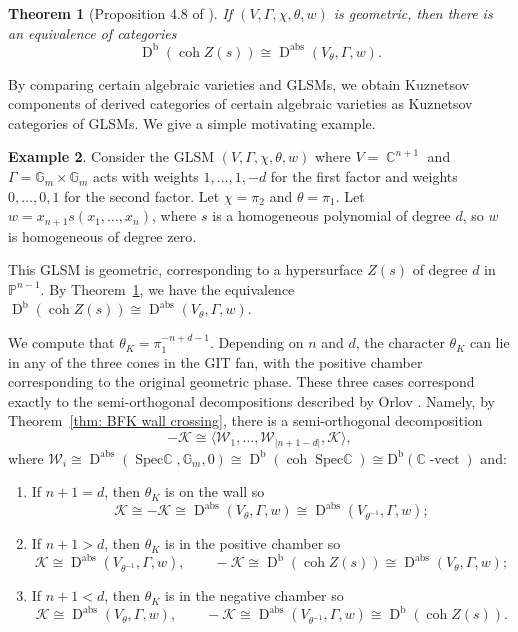 \documentclass[reqno, 12pt]{amsart}
\newtheorem{theorem}{Theorem}[section]
\theoremstyle{definition}
\newtheorem{example}[theorem]{Example}
\newcommand{\op}[1]{\operatorname{#1}}
\newcommand{\dbcoh}[1]{\operatorname{D}^{\operatorname{b}}(\operatorname{coh }#1)}
\newcommand{\dabs}{\op{D}^{\op{abs}}}
\newcommand{\gm}{\mathbb{G}_m}
\def\C{\op{\mathbb{C}}}
\numberwithin{equation}{section}
\begin{document}
\begin{theorem}[Proposition 4.8 of \cite{Hirano}] \label{thm: IsikShipmanHirano}
If $(V, \Gamma, \chi, \theta, w)$ is geometric, then there is an equivalence of categories
\[
\dbcoh{Z(s)} \cong  \dabs(V_\theta, \Gamma, w).
\]
\end{theorem} 

By comparing certain algebraic varieties and GLSMs, we obtain Kuznetsov components of derived categories of certain algebraic varieties as Kuznetsov categories of GLSMs.
We give a simple motivating example.
\begin{example}\label{standard example}
Consider the GLSM $(V, \Gamma, \chi, \theta, w)$ where $V = \C^{n+1}$ and $\Gamma =  \mathbb G_m \times \mathbb G_m$ acts with weights $1, \dots,  1, -d$ for the first factor and weights $0,\dots, 0, 1$ for the second factor. Let $\chi = \pi_2$ and $\theta= \pi_1$. Let  $w=x_{n+1}s(x_1, \dots, x_n)$, where $s$ is a homogeneous polynomial of degree $d$, so $w$ is homogeneous of degree zero. 

This GLSM is geometric, corresponding to a hypersurface $Z(s)$ of degree $d$ in $\mathbb P^{n-1}$. By Theorem~\ref{thm: IsikShipmanHirano}, we have the equivalence $\dbcoh{Z(s)} \cong  \dabs(V_\theta, \Gamma, w)$. 

We compute that $\theta_K = \pi_1^{-n+d-1}$. Depending on $n$ and $d$, the character $\theta_K$ can lie in any of the three cones in the GIT fan, with the positive chamber corresponding to the original geometric phase.  These three cases correspond exactly to the semi-orthogonal decompositions described by Orlov \cite{Orlov}.  Namely, by Theorem~\ref{thm: BFK wall crossing}, there is a semi-orthogonal decomposition
        $$
 -   \mathcal K \cong \langle \mathcal{W}_1, \dots, \mathcal{W}_{|n+1-d|}, \mathcal K\rangle, 
    $$
    where $\mathcal{W}_i \cong \dabs(\op{Spec \C}, \gm, 0) \cong \dbcoh{ \op{Spec \C}} \cong \op{D^b(\mathbb C\op{-vect})}$ and:
\begin{enumerate}
    \item If $n+1 = d$, then $\theta_K$ is on the wall so $$\mathcal K \cong -\mathcal K \cong \dabs (V_{\theta}, \Gamma, w)\cong \dabs (V_{\theta^{-1}}, \Gamma, w);$$
    \item If $n+1>d$, then $\theta_K$  is in the positive chamber so $$\mathcal K \cong \dabs (V_{\theta^{-1}}, \Gamma, w), \qquad -\mathcal K \cong   \dbcoh{ Z(s)} \cong \dabs (V_\theta, \Gamma, w);$$
    \item If $n+1 < d$, then $\theta_K$ is in the negative chamber so $$\mathcal K \cong \dabs (V_{\theta}, \Gamma, w), \qquad -\mathcal K \cong \dabs (V_{\theta^{-1}}, \Gamma, w) \cong \dbcoh{ Z(s)}.$$
\end{enumerate}


\end{example}
\end{document}
